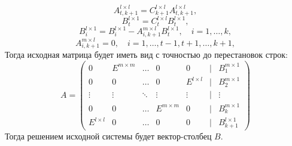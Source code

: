 \documentclass[a4paper,12pt]{article}
\begin{document}
$$
    A^{l \times l}_{t,k+1}=C^{l \times l}_{k+1}A^{l \times l}_{t,k+1},
$$
$$
    B^{l \times 1}_{t} = C^{l \times l}_{t}B^{l \times 1}_{t},
$$
$$
    B^{l \times 1}_i = B^{l \times 1}_i - A^{m \times l}_{i,k+1}B^{l \times 1}_{t}, \quad i=1,\dots,k,
$$
$$
    A^{m \times l}_{i,k+1}=0, \quad i=1,\dots,t-1,t+1,\dots,k+1,
$$
Тогда исходная матрица будет иметь вид с точностью до перестановок строк:
$$
    A=
   \begin{pmatrix}
     0 & E^{m \times m} &\ldots & 0 & 0 & \mid & B^{m \times 1}_1\\
     0 & 0 &\ldots & 0 & E^{l \times l} & \mid & B^{m \times 1}_2\\
     \vdots& \vdots &\ddots & \vdots & \vdots & \mid  & \vdots\\
    0 & 0 &\ldots & E^{m \times m} & 0 & \mid & B^{m \times 1}_k\\
     E^{l \times l} & 0 & \ldots & 0 & 0 & \mid & B^{l \times 1}_{k+1}
    \end{pmatrix}
$$
Тогда решением исходной системы будет вектор-столбец $B$.
\end{document}
